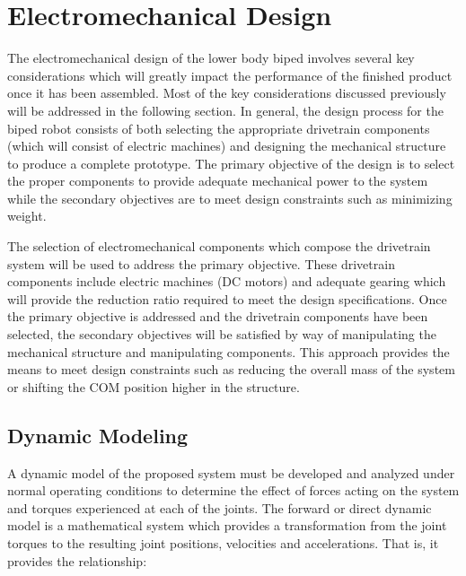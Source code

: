 \chapter{Electromechanical Design} %
\label{cha:design}
The electromechanical design of the lower body biped involves several key considerations which will greatly impact the performance of the finished product once it has been assembled. Most of the key considerations discussed previously will be addressed in the following section. In general, the design process for the biped robot consists of both selecting the appropriate drivetrain components (which will consist of electric machines) and designing the mechanical structure to produce a complete prototype. The primary objective of the design is to select the proper components to provide adequate mechanical power to the system while the secondary objectives are to meet design constraints such as minimizing weight. 

The selection of electromechanical components which compose the drivetrain system will be used to address the primary objective. These drivetrain components include electric machines (DC motors) and adequate gearing which will provide the reduction ratio required to meet the design specifications. Once the primary objective is addressed and the drivetrain components have been selected, the secondary objectives will be satisfied by way of manipulating the mechanical structure and manipulating components. This approach provides the means to meet design constraints such as reducing the overall mass of the system or shifting the COM position higher in the structure. 


\section{Dynamic Modeling} %
\label{sec:chassis}

A dynamic model of the proposed system must be developed and analyzed under normal operating conditions to determine the effect of forces acting on the system and torques experienced at each of the joints. The forward or direct dynamic model is a mathematical system which provides a transformation from the joint torques to the resulting joint positions, velocities and accelerations. That is, it provides the relationship:

